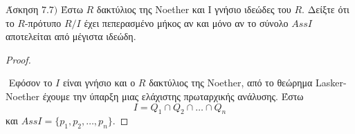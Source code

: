 \documentclass[oneside,a4paper]{article}
\newcommand {\tl}{\textlatin}
\begin{document}
\noindent Άσκηση $7.7)$
\quad Έστω $R$ δακτύλιος της \tl{Noether} και \tl{I} γνήσιο ιδεώδες του $R$. Δείξτε ότι το $R$-πρότυπο $R/I$ έχει πεπερασμένο μήκος αν και μόνο αν το σύνολο $AssI$ αποτελείται από μέγιστα ιδεώδη.
\vspace*{1cm}
\begin{proof} $ $

	$ $\newline
	Εφόσον το $I$ είναι γνήσιο και ο $R$ δακτύλιος της \tl{Noether}, από το θεώρημα \tl{Lasker-Noether} έχουμε την ύπαρξη μιας ελάχιστης πρωταρχικής ανάλυσης. Έστω $$I = Q_1 \cap Q_2 \cap \ldots \cap Q_n$$ και $AssI = \{p_1,p_2,\ldots,p_n\}$.
	
	




\end{proof}
\end{document}
